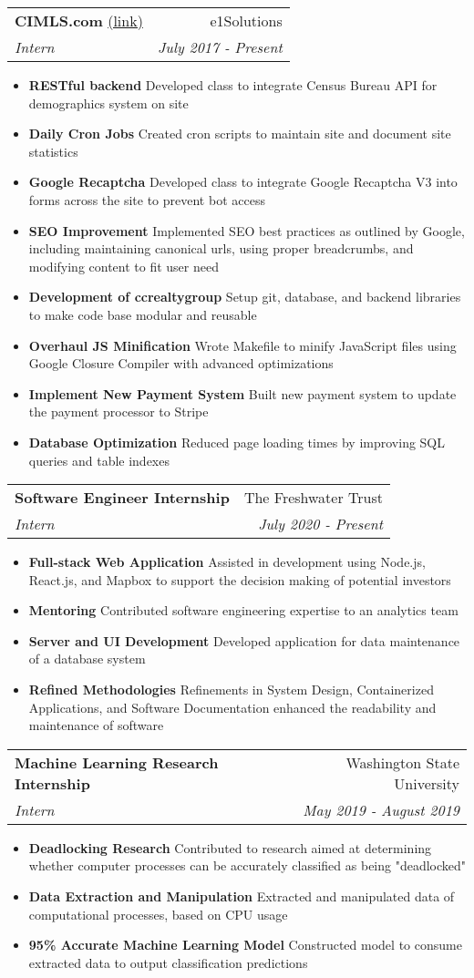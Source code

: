 \documentclass[letterpaper,11pt]{article}
\makeatletter
\newcommand{\resumeItem}[2]{
  \item\small{
    \textbf{#1}{ #2 \vspace{-2pt}}
  }
}
\newcommand{\resumeExperienceSubheading}[5]{
  \vspace{-1pt}\item
    \begin{tabular*}{0.97\textwidth}[t]{l@{\extracolsep{\fill}}r}
      \textbf{#1} #2 & #3 \\
      \textit{\small#4} & \textit{\small #5} \\
    \end{tabular*}\vspace{-5pt}
}
\newcommand{\resumeItemListStart}{\begin{itemize}[leftmargin=*]}
\newcommand{\resumeItemListEnd}{\end{itemize}\vspace{-5pt}}
\makeatother
\begin{document}
    \vspace{.5cm}  
    \resumeExperienceSubheading
    {CIMLS.com} {\href{https://www.cimls.com/}{(link)}}{e1Solutions}
    {Intern}{July 2017 - Present}
      \resumeItemListStart
        \resumeItem{RESTful backend}{Developed class to integrate Census Bureau API for demographics system on site}
        \resumeItem{Daily Cron Jobs}{Created cron scripts to maintain site and document site statistics}
        \resumeItem{Google Recaptcha}{Developed class to integrate Google Recaptcha V3 into forms across the site to prevent bot access}
        \resumeItem{SEO Improvement}{Implemented SEO best practices as outlined by Google, including maintaining canonical urls, using proper breadcrumbs, and modifying content to fit user need}
        \resumeItem{Development of ccrealtygroup}{Setup git, database, and backend libraries to make code base modular and reusable}
        \resumeItem{Overhaul JS Minification}{Wrote Makefile to minify JavaScript files using Google Closure Compiler with advanced optimizations}
        \resumeItem{Implement New Payment System}{Built new payment system to update the payment processor to Stripe}
        \resumeItem{Database Optimization}{Reduced page loading times by improving SQL queries and table indexes}
      \resumeItemListEnd
    \vspace{.5cm} 
    \resumeExperienceSubheading
    {Software Engineer Internship}{}{The Freshwater Trust}
    {Intern}{July 2020  - Present}
       \resumeItemListStart
        \resumeItem{Full-stack Web Application}{Assisted in development using Node.js, React.js, and Mapbox to support the decision making of potential investors}
        \resumeItem{Mentoring}{Contributed software engineering expertise to an analytics team}
         \resumeItem{Server and UI Development}{Developed application for data maintenance of a database system} 
         \resumeItem{Refined Methodologies}{Refinements in System Design, Containerized Applications, and Software Documentation enhanced the readability and maintenance of software}
       \resumeItemListEnd
    \vspace{.5cm} 
    \resumeExperienceSubheading
    {Machine Learning Research Internship}  {}{Washington State University}
    {Intern}{May 2019 - August 2019}
       \resumeItemListStart
         \resumeItem{Deadlocking Research}{Contributed to research aimed at determining whether computer processes can be accurately classified as being "deadlocked"}
         \resumeItem{Data Extraction and Manipulation}{Extracted and manipulated data of computational processes, based on CPU usage}
         \resumeItem{95\% Accurate Machine Learning Model}{Constructed model to consume extracted data to output classification predictions}
       \resumeItemListEnd
\end{document}
